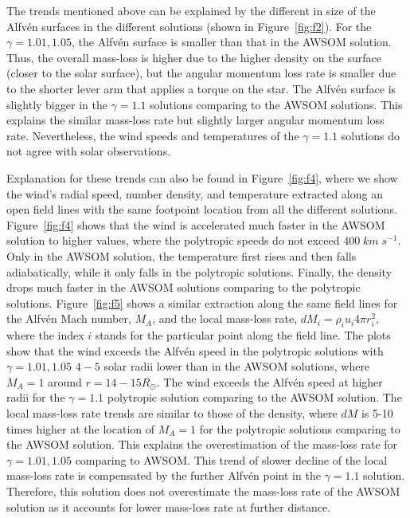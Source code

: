 \documentclass[apj]{emulateapj}
\begin{document}
The trends mentioned above can be explained by the different in size of the Alfv\'en surfaces in the different solutions (shown in Figure~\ref{fig:f2}). For the $\gamma=1.01,1.05$, the Alfv\'en surface is smaller than that in the AWSOM solution. Thus, the overall mass-loss is higher due to the higher density on the surface (closer to the solar surface), but the angular momentum loss rate is smaller due to the shorter lever arm that applies a torque on the star. The Alfv\'en surface is slightly bigger in the $\gamma=1.1$ solutions comparing to the AWSOM solutions. This explains the similar mass-loss rate but slightly larger angular momentum loss rate. Nevertheless, the wind speeds and temperatures of the $\gamma=1.1$ solutions do not agree with solar observations.

Explanation for these trends can also be found in Figure~\ref{fig:f4}, where we show the wind's radial speed, number density, and temperature extracted along an open field lines with the same footpoint location from all the different solutions. Figure~\ref{fig:f4} shows that the wind is accelerated much faster in the AWSOM solution to higher values, where the polytropic speeds do not exceed $400\;km\;s^{-1}$. Only in the AWSOM solution, the temperature first rises and then falls adiabatically, while it only falls in the polytropic solutions. Finally, the density drops much faster in the AWSOM solutions comparing to the polytropic solutions. Figure~\ref{fig:f5} shows a similar extraction along the same field lines for the Alfv\'en Mach number, $M_A$, and the local mass-loss rate, $dM_i=\rho_i u_i 4\pi r^2_i$, where the index $i$ stands for the particular point along the field line. The plots show that the wind exceeds the Alfv\'en speed in the polytropic solutions with $\gamma=1.01,1.05$ $4-5$ solar radii lower than in the AWSOM solutions, where $M_A=1$ around $r=14-15R_\odot$. The wind exceeds the Alfv\'en speed at higher radii for the $\gamma=1.1$ polytropic solution comparing to the AWSOM solution. The local mass-loss rate trends are similar to those of the density, where $dM$ is 5-10 times higher at the location of $M_A=1$ for the polytropic solutions comparing to the AWSOM solution. This explains the overestimation of the mass-loss rate for $\gamma=1.01,1.05$ comparing to AWSOM. This trend of slower decline of the local mass-loss rate is compensated by the further Alfv\'en point in the $\gamma=1.1$ solution. Therefore, this solution does not overestimate the mass-loss rate of the AWSOM solution as it accounts for lower mass-loss rate at further distance. 
\end{document}

